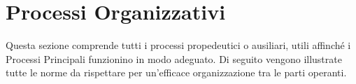 \section{Processi Organizzativi}
	Questa sezione comprende tutti i processi propedeutici o ausiliari, utili affinché i Processi Principali funzionino in modo adeguato. Di seguito vengono illustrate tutte le norme da rispettare per un'efficace organizzazione tra le parti operanti.

	
	
